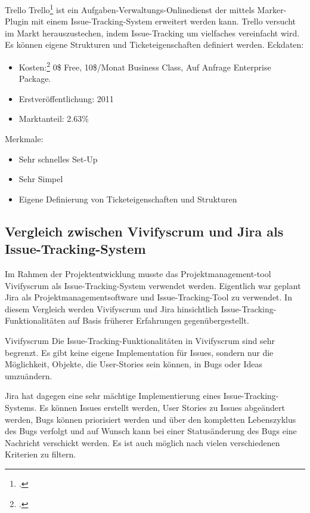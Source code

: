 Trello
Trello\footcite{trello} ist ein Aufgaben-Verwaltungs-Onlinedienst der mittels Marker-Plugin mit einem Issue-Tracking-System erweitert werden kann. Trello versucht im Markt herauszustechen, indem Issue-Tracking um vielfaches vereinfacht wird. Es können eigene Strukturen und Ticketeigenschaften definiert werden. 
Eckdaten:
\begin{itemize}
	\item Kosten:\footcite{trello-pricing} 0\$ Free, 10\$/Monat Business Class, Auf Anfrage Enterprise Package.
	\item Erstveröffentlichung: 2011
	\item Marktanteil: 2.63\%
\end{itemize}		
Merkmale:
\begin{itemize}
	\item Sehr schnelles Set-Up
	\item Sehr Simpel
	\item Eigene Definierung von Ticketeigenschaften und Strukturen
\end{itemize}			
\subsection{Vergleich zwischen Vivifyscrum und Jira als Issue-Tracking-System}
Im Rahmen der Projektentwicklung musste das Projektmanagement-tool Vivifyscrum als Issue-Tracking-System verwendet werden. Eigentlich war geplant Jira als Projektmanagementsoftware und Issue-Tracking-Tool zu verwendet. In diesem Vergleich werden Vivifyscrum und Jira hinsichtlich Issue-Tracking-Funktionalitäten auf Basis früherer Erfahrungen gegenübergestellt. 

Vivifyscrum
Die Issue-Tracking-Funktionalitäten in Vivifyscrum sind sehr begrenzt. Es gibt keine eigene Implementation für Issues, sondern nur die Möglichkeit, Objekte, die User-Stories sein können, in Bugs oder Ideas umzuändern.

Jira hat dagegen eine sehr mächtige Implementierung eines Issue-Tracking-Systems. Es können Issues erstellt werden, User Stories zu Issues abgeändert werden, Bugs können priorisiert werden und über den kompletten Lebenszyklus des Bugs verfolgt und auf Wunsch kann bei einer Statusänderung des Bugs eine Nachricht verschickt werden. Es ist auch möglich nach vielen verschiedenen Kriterien zu filtern.  